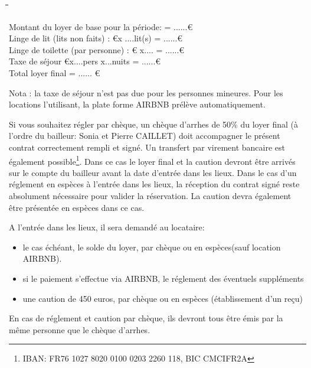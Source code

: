 \documentclass[a4paper,11pt]{article}
\begin{document}
\begin{tabbing}
  
 \hspace{6cm}\=  										\hspace{1cm}\=   	\hspace{4cm}\= 	\hspace{2cm}\= 		\hspace{2cm}\=	\kill


Montant du loyer de base pour la période: \>		\>		\>=			\>......\>\euro	   		\\


Linge de lit (lits non faits) :			 					\euro		      			\>x ....lit(s)       				\>=  			\>......\>\euro				\\



Linge de toilette (par personne) :					 					\euro      				\> x....							\>=  			\>......\>\euro				\\

Taxe de séjour \euro		\>x....pers x...nuits		\>=			\>......\>\euro	   		\\

Total loyer final    										\>						\>  					\>=  							\>......					\>\euro			\\ 

 \end{tabbing}


\vspace{0.5cm}

Nota : la taxe de séjour n’est pas due pour les personnes mineures. Pour les locations
l’utilisant, la plate forme AIRBNB prélève automatiquement.
\vspace{0.5cm}

  
Si vous souhaitez régler par chèque, un chèque d'arrhes de 50\% du loyer final (à l'ordre du bailleur: Sonia et Pierre CAILLET)  doit accompagner le présent contrat correctement rempli et signé. 
Un transfert par virement bancaire est également possible\footnote{IBAN: FR76 1027 8020 0100 0203 2260 118, BIC CMCIFR2A}. Dans ce cas le loyer final et la caution devront être arrivés sur le compte du bailleur avant la date d'entrée dans les lieux.
Dans le cas d'un réglement en espèces à l'entrée dans les lieux, la réception du contrat signé reste absolument nécessaire pour valider la réservation. La caution devra également être présentée en espèces dans ce cas.


\vspace{0.5cm}

A l'entrée dans les lieux, il sera demandé au locataire:
\begin{itemize}
\item le cas échéant, le solde du loyer, par chèque ou en espèces(sauf location AIRBNB).
\item si le paiement s'effectue via AIRBNB, le réglement des éventuels suppléments
\item une caution de 450 euros, par chèque ou en espèces (établissement d'un reçu)
\end{itemize}
En cas de réglement et caution par chèque, ils devront tous être émis par la même personne que le chèque d'arrhes.
\end{document}
